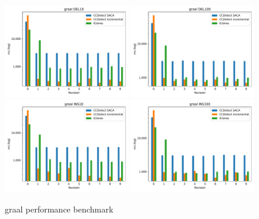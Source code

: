 \vfill

\newpage
\null
\vfill

\begin{figure}[H]
    \begin{center}
        \includegraphics[width=0.49\textwidth]{figures/performancegraphs/graal_DEL10.pdf}
        \includegraphics[width=0.49\textwidth]{figures/performancegraphs/graal_DEL100.pdf}
        \includegraphics[width=0.49\textwidth]{figures/performancegraphs/graal_INS10.pdf}
        \includegraphics[width=0.49\textwidth]{figures/performancegraphs/graal_INS100.pdf}
    \end{center}
    \caption{graal performance benchmark}
    \label{fig:graal}
\end{figure}

